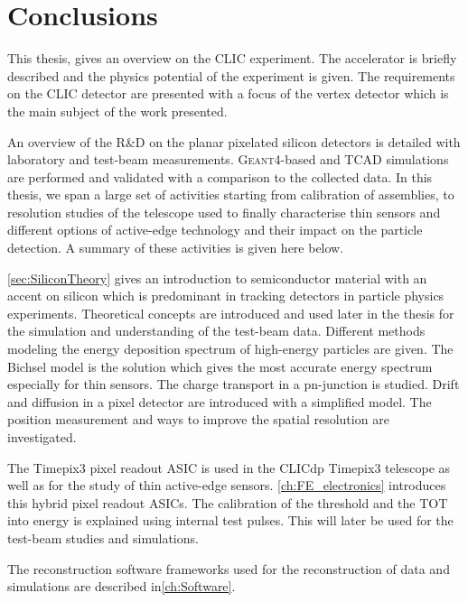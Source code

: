 \chapter{Conclusions}
\label{ch:conclusions}

This thesis, gives an overview on the CLIC experiment. The accelerator
is briefly described and the physics potential of the experiment is
given. The requirements on the CLIC detector are presented with a
focus of the vertex detector which is the main subject of the work
presented.

An overview of the R\&D on the planar pixelated silicon detectors is
detailed with laboratory and test-beam
measurements. \textsc{Geant4}-based and TCAD simulations are performed
and validated with a comparison to the collected data. In this thesis,
we span a large set of activities starting from calibration of
assemblies, to resolution studies of the telescope used to finally
characterise thin sensors and different options of active-edge
technology and their impact on the particle detection. A summary of
these activities is given here below.

\cref{sec:SiliconTheory} gives an introduction to semiconductor
material with an accent on silicon which is predominant in tracking
detectors in particle physics experiments. Theoretical concepts are
introduced and used later in the thesis for the simulation and
understanding of the test-beam data. Different methods modeling the
energy deposition spectrum of high-energy particles are given. The
Bichsel model is the solution which gives the most accurate energy
spectrum especially for thin sensors. The charge transport in a
pn-junction is studied. Drift and diffusion in a pixel detector are
introduced with a simplified model. The position measurement and ways
to improve the spatial resolution are investigated.

The Timepix3 pixel readout ASIC is used in the CLICdp Timepix3
telescope as well as for the study of thin active-edge
sensors. \cref{ch:FE_electronics} introduces this hybrid pixel readout
ASICs. The calibration of the threshold and the TOT into energy is
explained using internal test pulses. This will later be used for the
test-beam studies and simulations. 

The reconstruction software frameworks used for the reconstruction of
data and simulations are described in\cref{ch:Software}.

